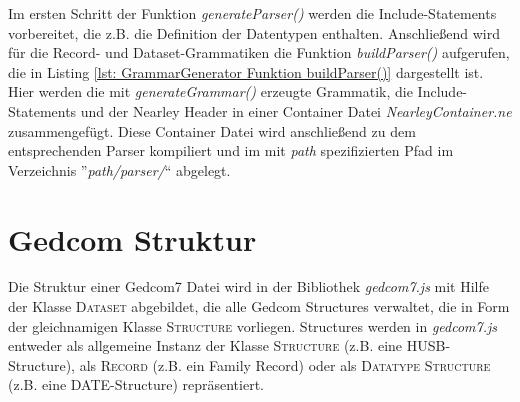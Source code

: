 Im ersten Schritt der Funktion \textit{generateParser()} werden die Include-Statements vorbereitet, die z.B. die Definition der Datentypen enthalten. Anschließend wird für die Record- und Dataset-Grammatiken die Funktion \textit{buildParser()} aufgerufen, die in Listing \ref{lst: GrammarGenerator Funktion buildParser()} dargestellt ist. Hier werden die mit \textit{generateGrammar()} erzeugte Grammatik, die Include-Statements und der Nearley Header in einer Container Datei \textit{NearleyContainer.ne} zusammengefügt. Diese Container Datei wird anschließend zu dem entsprechenden Parser kompiliert und im mit \textit{path} spezifizierten Pfad im Verzeichnis ''\textit{path/parser/}`` abgelegt.
\vspace{0.9em}
\section{Gedcom Struktur}
\label{sec: Implementierung - Gedcom Struktur}
Die Struktur einer Gedcom7 Datei wird in der Bibliothek \textit{gedcom7.js} mit Hilfe der Klasse \textsc{Dataset} abgebildet, die alle Gedcom Structures verwaltet, die in Form der gleichnamigen Klasse \textsc{Structure} vorliegen. Structures werden in \textit{gedcom7.js} entweder als allgemeine Instanz der Klasse \textsc{Structure} (z.B. eine HUSB-Structure), als \textsc{Record} (z.B. ein Family Record) oder als \textsc{Datatype Structure} (z.B. eine DATE-Structure) repräsentiert. 

